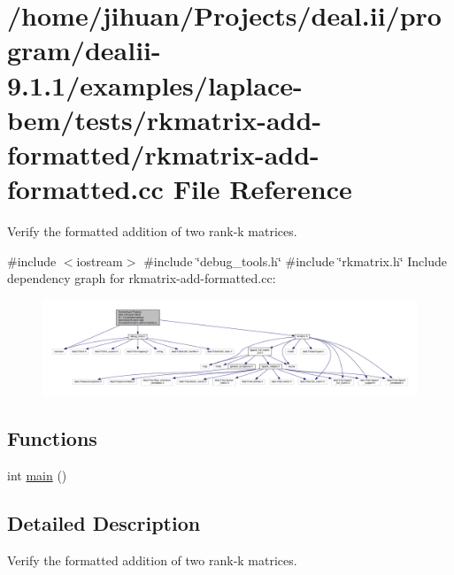 \hypertarget{rkmatrix-add-formatted_8cc}{}\section{/home/jihuan/\+Projects/deal.ii/program/dealii-\/9.1.1/examples/laplace-\/bem/tests/rkmatrix-\/add-\/formatted/rkmatrix-\/add-\/formatted.cc File Reference}
\label{rkmatrix-add-formatted_8cc}


Verify the formatted addition of two rank-\/k matrices.  


{\ttfamily \#include $<$iostream$>$}\newline
{\ttfamily \#include \char`\"{}debug\+\_\+tools.\+h\char`\"{}}\newline
{\ttfamily \#include \char`\"{}rkmatrix.\+h\char`\"{}}\newline
Include dependency graph for rkmatrix-\/add-\/formatted.cc\+:
\nopagebreak
\begin{figure}[H]
\begin{center}
\leavevmode
\includegraphics[width=350pt]{rkmatrix-add-formatted_8cc__incl}
\end{center}
\end{figure}
\subsection*{Functions}
\begin{DoxyCompactItemize}
\item 
int \hyperlink{rkmatrix-add-formatted_8cc_ae66f6b31b5ad750f1fe042a706a4e3d4}{main} ()
\end{DoxyCompactItemize}


\subsection{Detailed Description}
Verify the formatted addition of two rank-\/k matrices. 

